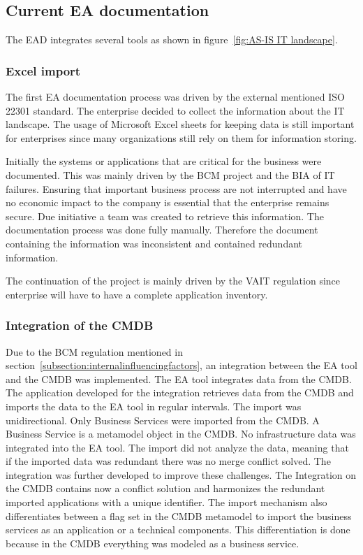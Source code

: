 \subsection{Current EA documentation}\label{subsection:currentead}

The EAD integrates several tools as shown in figure~\ref{fig:AS-IS IT landscape}. 

\subsubsection{Excel import}

The first EA documentation process was driven by the external mentioned ISO 22301 standard. The enterprise decided to collect the information about the IT landscape. The usage of Microsoft Excel sheets for keeping data is still important for enterprises since many organizations still rely on them for information storing. \cite{Farwick2013}

Initially the systems or applications that are critical for the business were documented. This was mainly driven by the BCM project and the BIA of IT failures. Ensuring that important business process are not interrupted and have no economic impact to the company is essential that the enterprise remains secure. Due initiative a team was created to retrieve this information. The documentation process was done fully manually. Therefore the document containing the information was inconsistent and contained redundant information.

The continuation of the project is mainly driven by the VAIT regulation since enterprise will have to have a complete application inventory.

\subsubsection{Integration of the CMDB}
Due to the BCM regulation mentioned in section~\ref{subsection:internalinfluencingfactors}, an integration between the EA tool and the CMDB was implemented. The EA tool integrates data from the CMDB. The application developed for the integration retrieves data from the CMDB and imports the data to the EA tool in regular intervals. The import was unidirectional. Only Business Services were imported from the CMDB. A Business Service is a metamodel object in the CMDB. No infrastructure data was integrated into the EA tool. The import did not analyze the data, meaning that if the imported data was redundant there was no merge conflict solved. The integration was further developed to improve these challenges. The Integration on the CMDB contains now a conflict solution and harmonizes the redundant imported applications with a unique identifier. The import mechanism also differentiates between a flag set in the CMDB metamodel to import the business services as an application or a technical components. This differentiation is done because in the CMDB everything was modeled as a business service.

